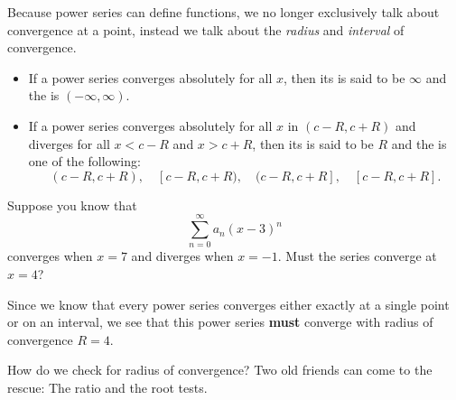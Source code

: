 \documentclass{ximera}
\begin{document}
Because power series can define functions, we no longer exclusively
talk about convergence at a point, instead we talk about the
\textit{radius} and \textit{interval} of convergence.

\begin{definition}
  \hfil
  \begin{itemize}
    \item If a power series converges absolutely for all $x$, then its
       is said to be $\infty$ and the
       is $(-\infty,\infty)$.
    \item If a power series converges absolutely for all $x$ in
      $(c-R,c+R)$ and diverges for all $x<c-R$ and $x>c+R$, then its
       is said to be $R$ and the
       is one of the following:
      \[
      (c-R,c+R),\quad [c-R,c+R),\quad (c-R,c+R],\quad [c-R,c+R].
      \]
  \end{itemize}
\end{definition}

\begin{question}
  Suppose you know that
  \[
  \sum_{n=0}^\infty a_n (x-3)^n
  \]
  converges when $x =7$ and diverges when $x = -1$. Must the series
  converge at $x=4$?
  \begin{prompt}
    \begin{multipleChoice}
    \end{multipleChoice}
  \end{prompt}
  \begin{feedback}
    Since we know that every power series converges either exactly at
    a single point or on an interval, we see that this power series
    \textbf{must} converge with radius of convergence $R=4$.
  \end{feedback}
\end{question}

How do we check for radius of convergence? Two old friends can come to
the rescue: The ratio and the root tests.
\end{document}
